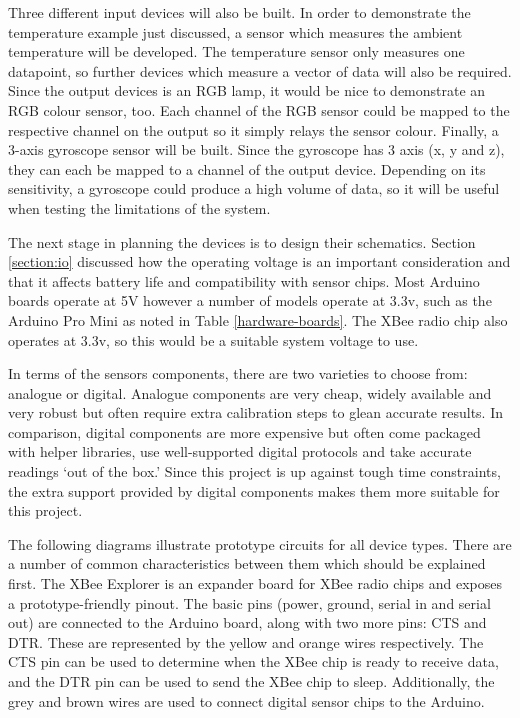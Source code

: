         Three different input devices will also be built. In order to demonstrate the temperature example just discussed, a sensor which measures the ambient temperature will be developed. The temperature sensor only measures one datapoint, so further devices which measure a vector of data will also be required. Since the output devices is an RGB lamp, it would be nice to demonstrate an RGB colour sensor, too. Each channel of the RGB sensor could be mapped to the respective channel on the output so it simply relays the sensor colour. Finally, a 3-axis gyroscope sensor will be built. Since the gyroscope has 3 axis (x, y and z), they can each be mapped to a channel of the output device. Depending on its sensitivity, a gyroscope could produce a high volume of data, so it will be useful when testing the limitations of the system.

        The next stage in planning the devices is to design their schematics. Section \ref{section:io} discussed how the operating voltage is an important consideration and that it affects battery life and compatibility with sensor chips. Most Arduino boards operate at 5V however a number of models operate at 3.3v, such as the Arduino Pro Mini as noted in Table \ref{hardware-boards}. The XBee radio chip also operates at 3.3v, so this would be a suitable system voltage to use.

        In terms of the sensors components, there are two varieties to choose from: analogue or digital. Analogue components are very cheap, widely available and very robust but often require extra calibration steps to glean accurate results. In comparison, digital components are more expensive but often come packaged with helper libraries, use well-supported digital protocols and take accurate readings `out of the box.' Since this project is up against tough time constraints, the extra support provided by digital components makes them more suitable for this project.

        The following diagrams illustrate prototype circuits for all device types. There are a number of common characteristics between them which should be explained first. The XBee Explorer is an expander board for XBee radio chips and exposes a prototype-friendly pinout. The basic pins (power, ground, serial in and serial out) are connected to the Arduino board, along with two more pins: CTS and DTR. These are represented by the yellow and orange wires respectively. The CTS pin can be used to determine when the XBee chip is ready to receive data, and the DTR pin can be used to send the XBee chip to sleep. Additionally, the grey and brown wires are used to connect digital sensor chips to the Arduino.

